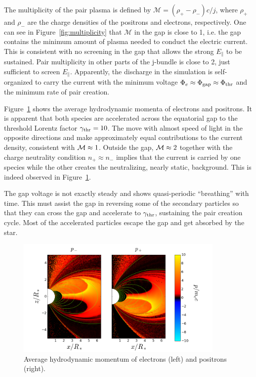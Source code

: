 The multiplicity of the pair plasma is defined by $\mathcal{M} = (\rho_+-\rho_{-})c/j$,
where $\rho_+$ and $\rho_-$ are the charge densities of the positrons and electrons,
respectively. One can see in Figure~\ref{fig:multiplicity} that $\mathcal{M}$
in the gap is close to 1, i.e. the gap contains the minimum amount of plasma needed to
conduct the electric current.
This is consistent
with no screening in the gap that allows the strong $E_\parallel$ to be
sustained. Pair multiplicity in other parts of the j-bundle is
close to 2,
just sufficient to screen $E_\parallel$. Apparently, the discharge in the
simulation is self-organized to carry the current with the minimum voltage
$\Phi_e\approx\Phi_{\rm gap}\approx\Phi_{\rm thr}$ and the minimum rate of pair
creation.

Figure~\ref{fig:momenta} shows the average hydrodynamic momenta of
electrons and positrons. It is apparent that both species are accelerated across the
equatorial gap to the threshold Lorentz factor $\gamma_{\rm thr}=10$. The move with almost
speed of light in the opposite directions and make approximately equal contributions
to the current density, consistent with ${\cal M}\approx 1$.
Outside the gap,
${\cal M}\approx 2$ together with the charge neutrality condition $n_+\approx n_-$
implies that the current is carried by one species while the other creates the
neutralizing, nearly static, background. This is indeed observed in
Figure~\ref{fig:momenta}.

The gap voltage is not exactly steady and shows quasi-periodic ``breathing'' with time.
This must assist the gap in reversing some of the secondary particles so that
they can cross the gap and accelerate to $\gamma_{\rm thr}$, sustaining the pair creation cycle.
Most of the accelerated particles escape the gap and get absorbed by the star.

\begin{figure}[t]
  \centering
  \includegraphics[width=0.9\textwidth]{pics/chap4/momentum.png}
  \caption[Average hydrodynamic momenta in magnetar magnetosphere]{Average hydrodynamic momentum of electrons (left) and positrons (right).}
  \label{fig:momenta}
\end{figure}


